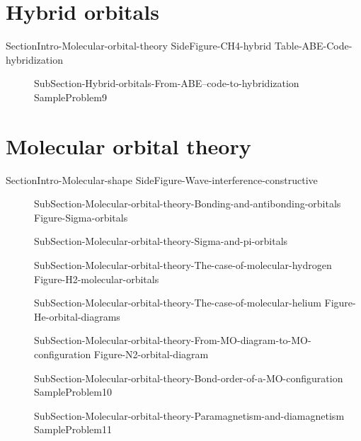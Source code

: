 \documentclass[main.tex]{subfiles}
\newcommand\chapterlabel{Ch-electronicstructure}\setcounter{figurenewcounter}{0}\setcounter{tablenewcounter}{0}\setcounter{formulanewcounter}{0}\chapterpicture{../{\chapterlabel}/figure1}\chapterpicturelabel{PxFuel}
\begin{document}
\section{Hybrid orbitals}{SectionIntro-Molecular-orbital-theory}
{SideFigure-CH4-hybrid}
{Table-ABE-Code-hybridization}	
\sloppy \begin{description}
\item[] {SubSection-Hybrid-orbitals-From-ABE--code-to-hybridization}
{SampleProblem9}
\end{description}
\newpage
\section{Molecular orbital theory}
{SectionIntro-Molecular-shape} 
{SideFigure-Wave-interference-constructive}	
\sloppy\begin{description}
\item[] {SubSection-Molecular-orbital-theory-Bonding-and-antibonding-orbitals}
{Figure-Sigma-orbitals}  
\vspace{1cm}{SideFigure-Wave-interference-destructive} \vspace{3cm}
\item[] {SubSection-Molecular-orbital-theory-Sigma-and-pi-orbitals}
\vspace{-1cm}{Figure-Pi-orbitals}
\item[] {SubSection-Molecular-orbital-theory-The-case-of-molecular-hydrogen}
{Figure-H2-molecular-orbitals}
\item[] {SubSection-Molecular-orbital-theory-The-case-of-molecular-helium}
{Figure-He-orbital-diagrams}
\item[] {SubSection-Molecular-orbital-theory-From-MO-diagram-to-MO-configuration}
{Figure-N2-orbital-diagram}
\item[] {SubSection-Molecular-orbital-theory-Bond-order-of-a-MO-configuration}
{SampleProblem10}
\item[] {SubSection-Molecular-orbital-theory-Paramagnetism-and-diamagnetism}
{SampleProblem11}
\end{description}




 \checkoddpage\ifoddpage \clearpage\thispagestyle{empty}\mbox{}\clearpage \else  \fi 
\end{document}

